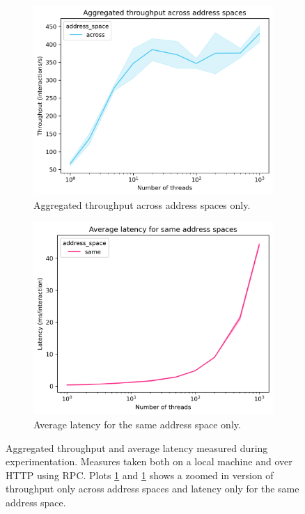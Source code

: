 \documentclass{article}
\begin{document}
\begin{figure}
\begin{subfigure}[b]{0.48\textwidth}
		\includegraphics[width=\textwidth]{plots/throughput_diff}
		\caption{Aggregated throughput across address spaces only.}
		\label{fig:throughput-diff}
	\end{subfigure}
	\hfill
	\begin{subfigure}[b]{0.48\textwidth}
		\includegraphics[width=\textwidth]{plots/latency_same}
		\caption{Average latency for the same address space only.}
		\label{fig:latency-same}
	\end{subfigure}
	\caption{Aggregated throughput and average latency measured during experimentation. Measures taken both on a local machine and over HTTP using RPC. Plots \ref{fig:throughput-diff} and \ref{fig:throughput-diff} shows a zoomed in version of throughput only across address spaces and latency only for the same address space.}
	\label{fig:throughput-latency}
\end{figure}
\end{document}
